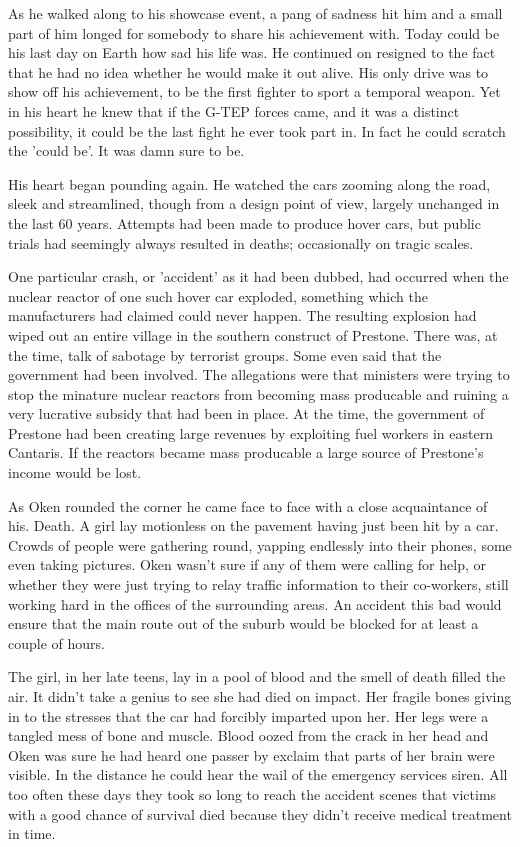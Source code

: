 As he walked along to his showcase event, a pang of sadness hit him and a small part of him longed for somebody to share his achievement with. Today could be his last day on Earth how sad his life was. He continued on resigned to the fact that he had no idea whether he would make it out alive. His only drive was to show off his achievement, to be the first fighter to sport a temporal weapon. Yet in his heart he knew that if the G-TEP forces came, and it was a distinct possibility, it could be the last fight he ever took part in. In fact he could scratch the 'could be'. It was damn sure to be.

His heart began pounding again. He watched the cars zooming along the road, sleek and streamlined, though from a design point of view, largely unchanged in the last 60 years. Attempts had been made to produce hover cars, but public trials had seemingly always resulted in deaths; occasionally on tragic scales.

One particular crash, or 'accident' as it had been dubbed, had occurred when the nuclear reactor of one such hover car exploded, something which the manufacturers had claimed could never happen. The resulting explosion had wiped out an entire village in the southern construct of Prestone. There was, at the time, talk of sabotage by terrorist groups. Some even said that the government had been involved. The allegations were that ministers were trying to stop the minature nuclear reactors from becoming mass producable and ruining a very lucrative subsidy that had been in place. At the time, the government of Prestone had been creating large revenues by exploiting fuel workers in eastern Cantaris. If the reactors became mass producable a large source of Prestone's income would be lost.

As Oken rounded the corner he came face to face with a close acquaintance of his. Death. A girl lay motionless on the pavement having just been hit by a car. Crowds of people were gathering round, yapping endlessly into their phones, some even taking pictures. Oken wasn't sure if any of them were calling for help, or whether they were just trying to relay traffic information to their co-workers, still working hard in the offices of the surrounding areas. An accident this bad would ensure that the main route out of the suburb would be blocked for at least a couple of hours.

The girl, in her late teens, lay in a pool of blood and the smell of death filled the air. It didn't take a genius to see she had died on impact. Her fragile bones giving in to the stresses that the car had forcibly imparted upon her. Her legs were a tangled mess of bone and muscle. Blood oozed from the crack in her head and Oken was sure he had heard one passer by exclaim that parts of her brain were visible. In the distance he could hear the wail of the emergency services siren. All too often these days they took so long to reach the accident scenes that victims with a good chance of survival died because they didn't receive medical treatment in time.

